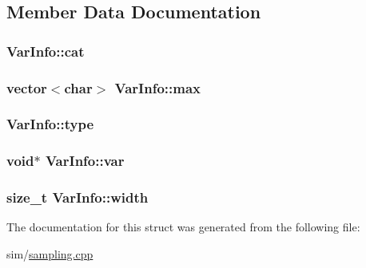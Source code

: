 \subsection{Member Data Documentation}
\hypertarget{struct_var_info_ab7908e7f5d06494242aabee44f31dd80}{
\subsubsection[{cat}]{ Var\+Info\+::cat}}\label{struct_var_info_ab7908e7f5d06494242aabee44f31dd80}
\hypertarget{struct_var_info_a533eda90157edc0c1beff84d81cce719}{
\subsubsection[{max}]{\setlength{\rightskip}{0pt plus 5cm}vector$<$char$>$ Var\+Info\+::max}}\label{struct_var_info_a533eda90157edc0c1beff84d81cce719}
\hypertarget{struct_var_info_a75acf394427435184ad8fdd1767fdecd}{
\subsubsection[{type}]{ Var\+Info\+::type}}\label{struct_var_info_a75acf394427435184ad8fdd1767fdecd}
\hypertarget{struct_var_info_a6d42af8892c0cecf33eaef2bde33bf66}{
\subsubsection[{var}]{\setlength{\rightskip}{0pt plus 5cm}void$\ast$ Var\+Info\+::var}}\label{struct_var_info_a6d42af8892c0cecf33eaef2bde33bf66}
\hypertarget{struct_var_info_ab17f8a2c7644b0b1ba932a0d903fcae1}{
\subsubsection[{width}]{\setlength{\rightskip}{0pt plus 5cm}size\+\_\+t Var\+Info\+::width}}\label{struct_var_info_ab17f8a2c7644b0b1ba932a0d903fcae1}


The documentation for this struct was generated from the following file\+:\begin{DoxyCompactItemize}
\item 
sim/\hyperlink{sampling_8cpp}{sampling.\+cpp}\end{DoxyCompactItemize}
